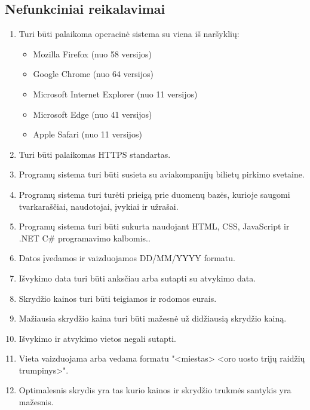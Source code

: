 \documentclass{VUMIFPSkursinis}
\begin{document}
            \subsection{Nefunkciniai reikalavimai}
                \begin{enumerate}[label=\textbf{NFR\arabic*}.]
                    \item Turi būti palaikoma operacinė sistema su viena iš naršyklių:
                    \begin{itemize}
                        \item Mozilla Firefox (nuo 58 versijos)
                        \item Google Chrome (nuo 64 versijos)
                        \item Microsoft Internet Explorer (nuo 11 versijos)
                        \item Microsoft Edge (nuo 41 versijos)
                        \item Apple Safari (nuo 11 versijos)
                    \end{itemize}
                    \item Turi būti palaikomas HTTPS standartas.
                    \item Programų sistema turi būti susieta su aviakompanijų bilietų pirkimo svetaine.
                    \item Programų sistema turi turėti prieigą prie duomenų bazės, kurioje saugomi tvarkaraščiai, naudotojai, įvykiai ir užrašai.
                    \item Programų sistema turi būti sukurta naudojant HTML, CSS, JavaScript ir .NET C# programavimo kalbomis..
                    \item Datos įvedamos ir vaizduojamos DD/MM/YYYY formatu.
                    \item Išvykimo data turi būti anksčiau arba sutapti su atvykimo data.
                    \item Skrydžio kainos turi būti teigiamos ir rodomos eurais.
                    \item Mažiausia skrydžio kaina turi būti mažesnė už didžiausią skrydžio kainą.
                    \item Išvykimo ir atvykimo vietos negali sutapti.
                    \item Vieta vaizduojama arba vedama formatu "<miestas> <oro uosto trijų raidžių trumpinys>".
                    \item \label{optimal} Optimalesnis skrydis yra tas kurio kainos ir skrydžio trukmės santykis yra mažesnis.

\end{enumerate}
\end{document}
